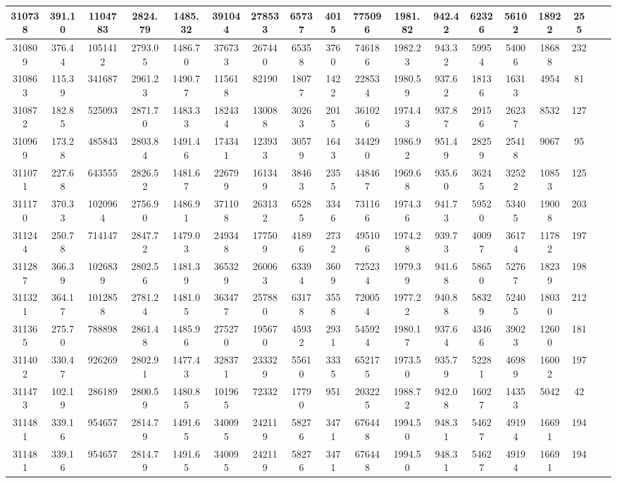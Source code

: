 \documentclass[10pt]{extarticle}
\begin{document}
\begin{longtable}{|c|c|c|c|c|c|c|c|c|c|c|c|c|c|c|c|c|c|}
\hline 
310738&391.10&1104783&2824.79&1485.32&391044&278533&65737&4015&775096&1981.82&942.42&62326&56102&18922&255 \\ 
\hline 
310809&376.44&1051412&2793.05&1486.70&376733&267440&65358&3760&746186&1982.23&943.32&59954&54006&18688&232 \\ 
\hline 
310863&115.39&341687&2961.23&1490.77&115618&82190&18077&1422&228534&1980.59&937.62&18136&16313&4954&81 \\ 
\hline 
310872&182.85&525093&2871.70&1483.33&182434&130088&30263&2015&361026&1974.43&937.87&29156&26237&8532&127 \\ 
\hline 
310969&173.28&485843&2803.84&1491.46&174341&123933&30579&1643&344290&1986.92&951.49&28259&25418&9067&95 \\ 
\hline 
311071&227.68&643555&2826.52&1481.67&226799&161349&38463&2355&448467&1969.68&935.60&36245&32522&10853&125 \\ 
\hline 
311170&370.33&1020964&2756.90&1486.91&371108&263132&65285&3346&731166&1974.36&941.73&59520&53405&19008&203 \\ 
\hline 
311244&250.78&714147&2847.72&1479.03&249348&177509&41896&2732&495106&1974.28&939.73&40097&36174&11782&197 \\ 
\hline 
311287&366.39&1026839&2802.56&1481.39&365329&260063&63394&3609&725234&1979.39&941.68&58650&52767&18239&198 \\ 
\hline 
311321&364.17&1012858&2781.24&1481.05&363477&257880&63178&3558&720054&1977.22&940.88&58329&52405&18030&212 \\ 
\hline 
311365&275.70&788898&2861.48&1485.96&275270&195670&45932&2931&545924&1980.17&937.64&43466&39023&12600&181 \\ 
\hline 
311402&330.47&926269&2802.91&1477.43&328371&233329&55610&3335&652175&1973.50&935.79&52281&46989&16002&197 \\ 
\hline 
311473&102.19&286189&2800.59&1480.85&101965&72332&17790&951&203225&1988.72&942.08&16027&14353&5042&42 \\ 
\hline 
311481&339.16&954657&2814.79&1491.65&340095&242119&58276&3471&676448&1994.50&948.31&54627&49194&16691&194 \\ 
\hline 
311481&339.16&954657&2814.79&1491.65&340095&242119&58276&3471&676448&1994.50&948.31&54627&49194&16691&194 \\ 
\hline 
\end{longtable} 
\end{document}
